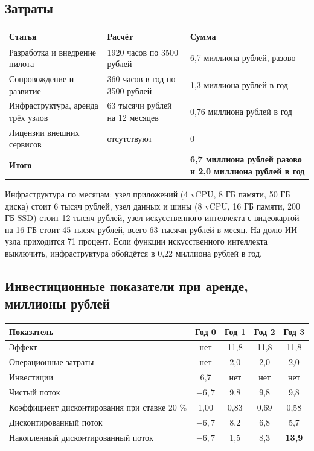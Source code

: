 \documentclass[11pt]{article}
\begin{document}
\subsection{Затраты}
\begin{longtable}{|L{6.4cm}|L{4.4cm}|L{5.2cm}|}
\hline
\textbf{Статья} & \textbf{Расчёт} & \textbf{Сумма} \\ \hline
Разработка и внедрение пилота & 1920 часов по 3500 рублей & 6,7 миллиона рублей, разово \\ \hline
Сопровождение и развитие & 360 часов в год по 3500 рублей & 1,3 миллиона рублей в год \\ \hline
Инфраструктура, аренда трёх узлов & 63 тысячи рублей на 12 месяцев & 0,76 миллиона рублей в год \\ \hline
Лицензии внешних сервисов & отсутствуют & 0 \\ \hline
\textbf{Итого} & & \textbf{6,7 миллиона рублей разово и 2,0 миллиона рублей в год} \\ \hline
\end{longtable}

Инфраструктура по месяцам: узел приложений (4 vCPU, 8 ГБ памяти, 50 ГБ диска)
стоит 6 тысяч рублей, узел данных и шины (8 vCPU, 16 ГБ памяти, 200 ГБ SSD)
стоит 12 тысяч рублей, узел искусственного интеллекта с видеокартой на 16 ГБ
стоит 45 тысяч рублей, всего 63 тысячи рублей в месяц. На долю ИИ-узла
приходится 71 процент. Если функции искусственного интеллекта выключить,
инфраструктура обойдётся в 0,22 миллиона рублей в год.

\subsection{Инвестиционные показатели при аренде, миллионы рублей}
\begin{longtable}{|L{6.2cm}|c|c|c|c|}
\hline
\textbf{Показатель} & \textbf{Год 0} & \textbf{Год 1} & \textbf{Год 2} & \textbf{Год 3} \\ \hline
Эффект & нет & 11,8 & 11,8 & 11,8 \\ \hline
Операционные затраты & нет & 2,0 & 2,0 & 2,0 \\ \hline
Инвестиции & 6,7 & нет & нет & нет \\ \hline
Чистый поток & $-6{,}7$ & 9,8 & 9,8 & 9,8 \\ \hline
Коэффициент дисконтирования при ставке 20 \% & 1,00 & 0,83 & 0,69 & 0,58 \\ \hline
Дисконтированный поток & $-6{,}7$ & 8,2 & 6,8 & 5,7 \\ \hline
Накопленный дисконтированный поток & $-6{,}7$ & 1,5 & 8,3 & \textbf{13,9} \\ \hline
\end{longtable}
\end{document}
